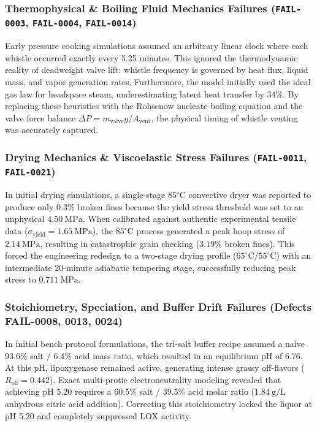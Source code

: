 \documentclass[10pt,a4paper]{article}
\begin{document}
\subsubsection{Thermophysical \& Boiling Fluid Mechanics Failures (\texttt{FAIL-0003}, \texttt{FAIL-0004}, \texttt{FAIL-0014})}
Early pressure cooking simulations assumed an arbitrary linear clock where each whistle occurred exactly every 5.25 minutes. This ignored the thermodynamic reality of deadweight valve lift: whistle frequency is governed by heat flux, liquid mass, and vapor generation rates. Furthermore, the model initially used the ideal gas law for headspace steam, underestimating latent heat transfer by $34\%$. By replacing these heuristics with the Rohsenow nucleate boiling equation and the valve force balance $\Delta P = m_{\mathrm{valve}} g / A_{\mathrm{vent}}$, the physical timing of whistle venting was accurately captured.

\subsubsection{Drying Mechanics \& Viscoelastic Stress Failures (\texttt{FAIL-0011}, \texttt{FAIL-0021})}
In initial drying simulations, a single-stage $85^\circ\mathrm{C}$ convective dryer was reported to produce only $0.3\%$ broken fines because the yield stress threshold was set to an unphysical $4.50\ \mathrm{MPa}$. When calibrated against authentic experimental tensile data ($\sigma_{\mathrm{yield}} = 1.65\ \mathrm{MPa}$), the $85^\circ\mathrm{C}$ process generated a peak hoop stress of $2.14\ \mathrm{MPa}$, resulting in catastrophic grain checking ($3.19\%$ broken fines). This forced the engineering redesign to a two-stage drying profile ($65^\circ\mathrm{C} / 55^\circ\mathrm{C}$) with an intermediate 20-minute adiabatic tempering stage, successfully reducing peak stress to $0.711\ \mathrm{MPa}$.

\subsubsection{Stoichiometry, Speciation, and Buffer Drift Failures (Defects FAIL-0008, 0013, 0024)}
In initial bench protocol formulations, the tri-salt buffer recipe assumed a naive 93.6\% salt / 6.4\% acid mass ratio, which resulted in an equilibrium pH of 6.76. At this pH, lipoxygenase remained active, generating intense grassy off-flavors ($R_{\mathrm{off}} = 0.442$). Exact multi-protic electroneutrality modeling revealed that achieving pH 5.20 requires a 60.5\% salt / 39.5\% acid molar ratio ($1.84\ \mathrm{g/L}$ anhydrous citric acid addition). Correcting this stoichiometry locked the liquor at pH 5.20 and completely suppressed LOX activity.
\end{document}

